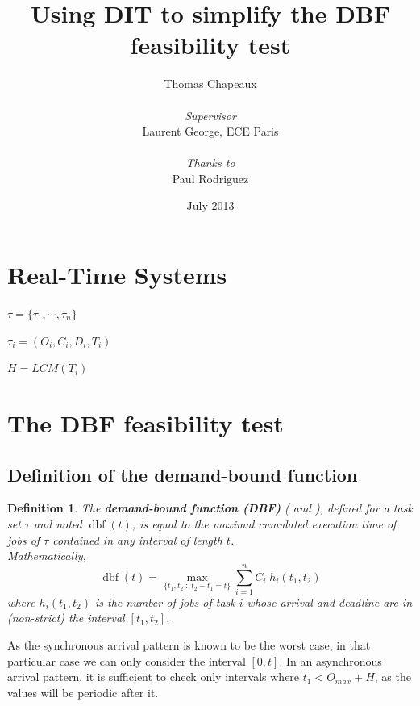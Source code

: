 \documentclass[a4paper,10pt]{article}
\newcommand{\dbf}[1]{\operatorname{dbf}(#1)}
\newtheorem{definition}{Definition}
\begin{document}
\title{Using DIT to simplify the DBF feasibility test}
\author{Thomas Chapeaux \\ ~ \\ \emph{Supervisor} \\ Laurent George, ECE Paris \\ ~ \\ \emph{Thanks to} \\ Paul Rodriguez}

\date{July 2013}

\maketitle

\tableofcontents

\newpage

\section{Real-Time Systems}

$\tau = \{ \tau_1, \cdots, \tau_n \}$

$\tau_i = (O_i, C_i, D_i, T_i)$

$H = LCM(T_i)$

\section{The DBF feasibility test}
\label{sct:DBF}

\subsection{Definition of the demand-bound function}

\begin{definition}
 The \textbf{demand-bound function (DBF)} (\cite{baruah1999generalized} and \cite{baruah1990algorithms}), defined for a task set $\tau$ and noted $\dbf{t}$, is equal to the maximal cumulated execution time of jobs of $\tau$ contained in any interval of length $t$.\\

 Mathematically,
 $$\dbf{t} = \max_{\{t_1, t_2 \; : \; t_2 - t_1 = t\}} \sum_{i=1}^n C_i \; h_i(t_1, t_2)$$
 where $h_i(t_1, t_2)$ is the number of jobs of task $i$ whose arrival and deadline are in (non-strict) the interval $[t_1, t_2]$.
\end{definition}

As the synchronous arrival pattern is known to be the worst case, in that particular case we can only consider the interval $[0, t]$. In an asynchronous arrival pattern, it is sufficient to check only intervals where $t_1 < O_{max} + H$, as the values will be periodic after it.\\
\end{document}
